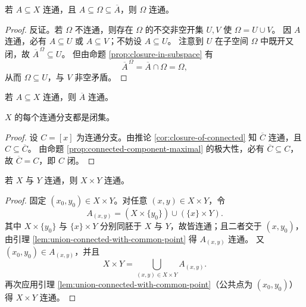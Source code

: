 \documentclass[lang=cn,a4paper,newtx,figureplace=section,tableplace=section]{elegantbook}
\begin{document}
\begin{proposition}\label{prop:connected-between-closure}
  若 $A\subseteq X$ 连通，且 $A\subseteq \Omega\subseteq \overline{A}$，则 $\Omega$ 连通。
\end{proposition}
\begin{proof}
  反证。若 $\Omega$ 不连通，则存在 $\Omega$ 的不交非空开集 $U,V$ 使 $\Omega=U\cup V$。
  因 $A$ 连通，必有 $A\subseteq U$ 或 $A\subseteq V$；不妨设 $A\subseteq U$。
  注意到 $U$ 在子空间 $\Omega$ 中既开又闭，故 $\overline{A}^{\,\Omega}\subseteq U$。
  但由命题 \ref{prop:closure-in-subspace} 有
  \[
    \overline{A}^{\,\Omega}=\overline{A}\cap\Omega=\Omega,
  \]
  从而 $\Omega\subseteq U$，与 $V$ 非空矛盾。
\end{proof}

\begin{corollary}\label{cor:closure-of-connected}
  若 $A\subseteq X$ 连通，则 $\overline{A}$ 连通。
\end{corollary}

\begin{proposition}\label{prop:connected-components-closed}
  $X$ 的每个连通分支都是闭集。
\end{proposition}
\begin{proof}
  设 $C=[x]$ 为连通分支。由推论 \ref{cor:closure-of-connected} 知 $\overline{C}$ 连通，且 $C\subseteq\overline{C}$。
  由命题 \ref{prop:connected-component-maximal} 的极大性，必有 $\overline{C}\subseteq C$，故 $\overline{C}=C$，即 $C$ 闭。
\end{proof}

\begin{proposition}\label{prop:product-connected-2}
  若 $X$ 与 $Y$ 连通，则 $X\times Y$ 连通。
\end{proposition}
\begin{proof}
  固定 $(x_0,y_0)\in X\times Y$。对任意 $(x,y)\in X\times Y$，令
  \[
    A_{(x,y)}=(X\times\{y_0\})\cup(\{x\}\times Y).
  \]
  其中 $X\times\{y_0\}$ 与 $\{x\}\times Y$ 分别同胚于 $X$ 与 $Y$，故皆连通；且二者交于 $(x,y_0)$，由引理 \ref{lem:union-connected-with-common-point} 得 $A_{(x,y)}$ 连通。
  又 $(x_0,y_0)\in A_{(x,y)}$，并且
  \[
    X\times Y=\bigcup_{(x,y)\in X\times Y}A_{(x,y)}.
  \]
  再次应用引理 \ref{lem:union-connected-with-common-point}（公共点为 $(x_0,y_0)$）得 $X\times Y$ 连通。
\end{proof}
\end{document}
